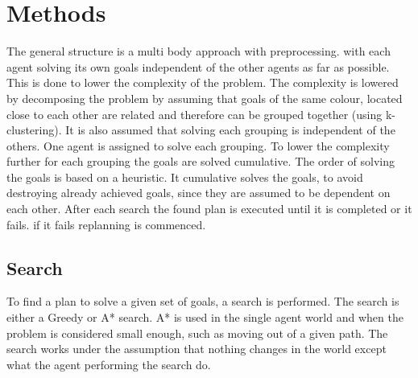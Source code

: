 \documentclass[letterpaper]{article}
\begin{document}
\section{Methods}
%		
%		
%		
		The general structure is a multi body approach with preprocessing. with each agent solving its own goals independent of the other agents as far as possible. This is done to lower the complexity of the problem. The complexity is lowered by decomposing the problem by assuming that goals of the same colour, located close to each other are related and therefore can be grouped together (using k-clustering). It is also assumed that solving each grouping is independent of the others. One agent is assigned to solve each grouping. 
		To lower the complexity further for each grouping the goals are solved cumulative. The order of solving the goals is based on a heuristic. It cumulative solves the goals, to avoid destroying already achieved goals, since they are assumed to be dependent on each other. After each search the found plan is executed until it is completed or it fails. if it fails replanning is commenced.

 
				
	\subsection{Search}
		To find a plan to solve a given set of goals, a search is performed. The search is either a Greedy or A* search. A* is used in the single agent world and when the problem is considered small enough, such as moving out of a given path. 
		The search works under the assumption that nothing changes in the world except what the agent performing the search do.
		
		
		
%		
\end{document}

